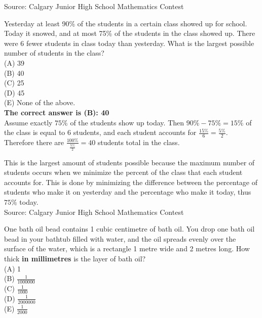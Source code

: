 \documentclass{article}
\begin{document}
\scriptsize
Source: Calgary Junior High School Mathematics Contest

\normalsize
Yesterday at least 90\% of the students in a certain class showed up for school. Today it snowed, and at most 75\% of the students in the class showed up. There were 6 fewer students in class today than yesterday. What is the largest possible number of students in the class?\\
(A) 39\\
(B) 40\\
(C) 25\\
(D) 45\\
(E) None of the above.\\


\textbf{The correct answer is (B): 40}\\[1 ex]
Assume exactly $75\%$ of the students show up today. Then $90\%-75\%=15\%$ of the class is equal to 6 students, and each student accounts for $\frac{15\%}{6}=\frac{5\%}{2}$. Therefore there are $\frac{100\%}{\frac{5\%}{2}}=40$ students total in the class.

This is the largest amount of students possible because the maximum number of students occurs when we minimize the percent of the class that each student accounts for. This is done by minimizing the difference between the percentage of students who make it on yesterday and the percentage who make it today, thus $75\%$ today.
\\[5 ex]

\scriptsize
Source: Calgary Junior High School Mathematics Contest

\normalsize
One bath oil bead contains 1 cubic centimetre of bath oil.
You drop one bath oil bead in your bathtub filled with water,
and the oil spreads evenly over the surface of the water, which
is a rectangle 1 metre wide and 2 metres long. How thick
\textbf{in millimetres} is the layer of bath oil?\\
(A) 1\\[1 ex]
(B) $\frac{1}{1000000}$\\[1 ex]
(C) $\frac{1}{1000}$\\[1 ex]
(D) $\frac{1}{2000000}$\\[1 ex]
(E) $\frac{1}{2000}$\\
\end{document}
